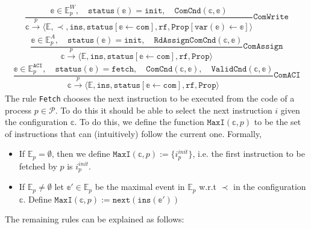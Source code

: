 \documentclass{article}
\begin{document}
$$\frac{\mathbb{e} \in \mathbb{E}_p^W, \hspace{1em} \texttt{status}(\mathbb{e}) = \texttt{init}, \hspace{1em} \texttt{ComCnd}(\mathbb{c},\mathbb{e})}{\mathbb{c} \xrightarrow[]{p} \langle \mathbb{E}, \prec, \texttt{ins}, \texttt{status}[\mathbb{e} \leftarrow \texttt{com}], \texttt{rf}, \texttt{Prop}[\texttt{var}(\mathbb{e}) \leftarrow \mathbb{e}]\rangle} \texttt{ComWrite}$$
$$\frac{\mathbb{e} \in \mathbb{E}_p^A, \hspace{1em} \texttt{status}(\mathbb{e}) = \texttt{init}, \hspace{1em} \texttt{RdAssignComCnd}(\mathbb{c},\mathbb{e})}{\mathbb{c} \xrightarrow[]{p} \langle \mathbb{E}, \texttt{ins}, \texttt{status}[\mathbb{e} \leftarrow \texttt{com}], \texttt{rf}, \texttt{Prop}\rangle} \texttt{ComAssign} $$
$$\frac{\mathbb{e} \in \mathbb{E}_p^\texttt{ACI}, \hspace{1em} \texttt{status}(\mathbb{e}) = \texttt{fetch}, \hspace{1em} \texttt{ComCnd}(\mathbb{c},\mathbb{e}), \hspace{1em} \texttt{ValidCnd}(\mathbb{c},\mathbb{e})}{\mathbb{c} \xrightarrow[]{p} \langle \mathbb{E}, \texttt{ins}, \texttt{status}[\mathbb{e} \leftarrow \texttt{com}], \texttt{rf}, \texttt{Prop} \rangle} \texttt{ComACI} $$
The rule \texttt{Fetch} chooses the next instruction to be executed from the code of a process $p \in \mathcal{P}$. To do this it should be able to select the next instruction $i$ given the configuration $\mathbb{c}$. To do this, we define the function $\texttt{MaxI}(\mathbb{c},p)$ to be the set of instructions that can (intuitively) follow the current one. Formally,
\begin{itemize}
    \setlength\itemsep{0em}
    \item If $\mathbb{E}_p = \emptyset$, then we define $\texttt{MaxI}(\mathbb{c},p) := \{i_p^{init}\}$, i.e. the first instruction to be fetched by $p$ is $i_p^{init}$.
    \item If $\mathbb{E}_p \neq \emptyset$ let $\mathbb{e}' \in \mathbb{E}_p$ be the maximal event in $\mathbb{E}_p$ w.r.t $\prec$ in the configuration $\mathbb{c}$. Define $\texttt{MaxI}(\mathbb{c},p) := \texttt{next}(\texttt{ins}(\mathbb{e}'))$
\end{itemize}
The remaining rules can be explained as follows:
\end{document}
